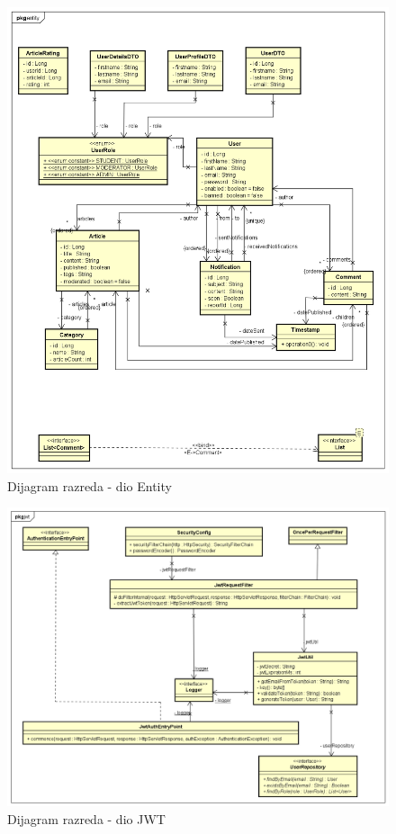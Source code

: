 \begin{figure}[H]
	\includegraphics[scale=0.4]{slike/Class Diagram Entity.png}
	\centering
	\caption{Dijagram razreda - dio Entity}
	\label{fig:class_diagram_entity}
\end{figure}

\eject

\begin{figure}[H]
	\includegraphics[scale=0.4]{slike/Class Diagram jwt.png}
	\centering
	\caption{Dijagram razreda - dio JWT}
	\label{fig:class_diagram_jwt}
\end{figure}

